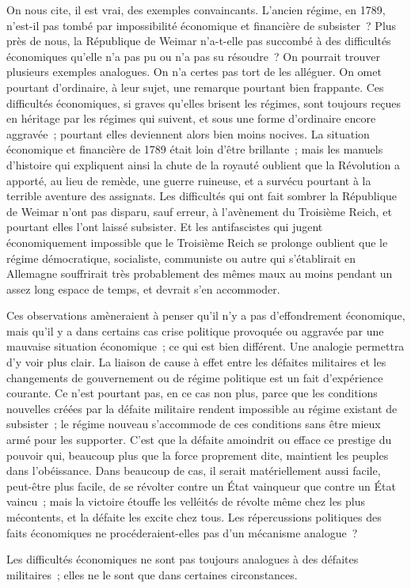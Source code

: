 \documentclass[french,twoside]{book} %
\begin{document}
On nous cite, il est vrai, des exemples convaincants. L'ancien régime, en 1789, n'est-il pas tombé par impossibilité économique et financière de subsister ? Plus près de nous, la République de Weimar n'a-t-elle pas succom­bé à des difficultés économiques qu'elle n'a pas pu ou n'a pas su résoudre ? On pourrait trouver plusieurs exemples analogues. On n'a certes pas tort de les alléguer. On omet pourtant d'ordinaire, à leur sujet, une remarque pourtant bien frappante. Ces difficultés économiques, si graves qu'elles brisent les régimes, sont toujours reçues en héritage par les régimes qui suivent, et sous une forme d'ordinaire encore aggravée ; pourtant elles deviennent alors bien moins nocives. La situation économique et financière de 1789 était loin d'être brillante ; mais les manuels d'histoire qui expliquent ainsi la chute de la royauté oublient que la Révolution a apporté, au lieu de remède, une guerre ruineuse, et a survécu pourtant à la terrible aventure des assignats. Les diffi­cultés qui ont fait sombrer la République de Weimar n'ont pas disparu, sauf erreur, à l'avènement du Troisième Reich, et pourtant elles l'ont laissé subsister. Et les antifascistes qui jugent économiquement impossible que le Troisième Reich se prolonge oublient que le régime démocratique, socialiste, communiste ou autre qui s'établirait en Allemagne souffrirait très probable­ment des mêmes maux au moins pendant un assez long espace de temps, et devrait s'en accommoder.\par
Ces observations amèneraient à penser qu'il n'y a pas d'effondrement économique, mais qu'il y a dans certains cas crise politique provoquée ou aggravée par une mauvaise situation économique ; ce qui est bien différent. Une analogie permettra d'y voir plus clair. La liaison de cause à effet entre les défaites militaires et les changements de gouvernement ou de régime politique est un fait d'expérience courante. Ce n'est pourtant pas, en ce cas non plus, parce que les conditions nouvelles créées par la défaite militaire rendent impossible au régime existant de subsister ; le régime nouveau s'accommode de ces conditions sans être mieux armé pour les supporter. C'est que la défaite amoindrit ou efface ce prestige du pouvoir qui, beaucoup plus que la force proprement dite, maintient les peuples dans l'obéissance. Dans beaucoup de cas, il serait matériellement aussi facile, peut-être plus facile, de se révolter contre un État vainqueur que contre un État vaincu ; mais la victoire étouffe les velléités de révolte même chez les plus mécontents, et la défaite les excite chez tous. Les répercussions politiques des faits économiques ne procéderaient-elles pas d'un mécanisme analogue ?\par
Les difficultés économiques ne sont pas toujours analogues à des défaites militaires ; elles ne le sont que dans certaines circonstances.\par
\end{document}
